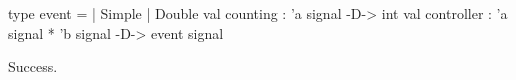 \runverbatimtrue
{}
\begin{RunVerbatimMsg}
type event   =  | Simple  | Double
val counting : 'a signal -D-> int
val controller : 'a signal * 'b signal -D-> event signal
\end{RunVerbatimMsg}
\begin{RunVerbatimErr}
Success.
\end{RunVerbatimErr}
